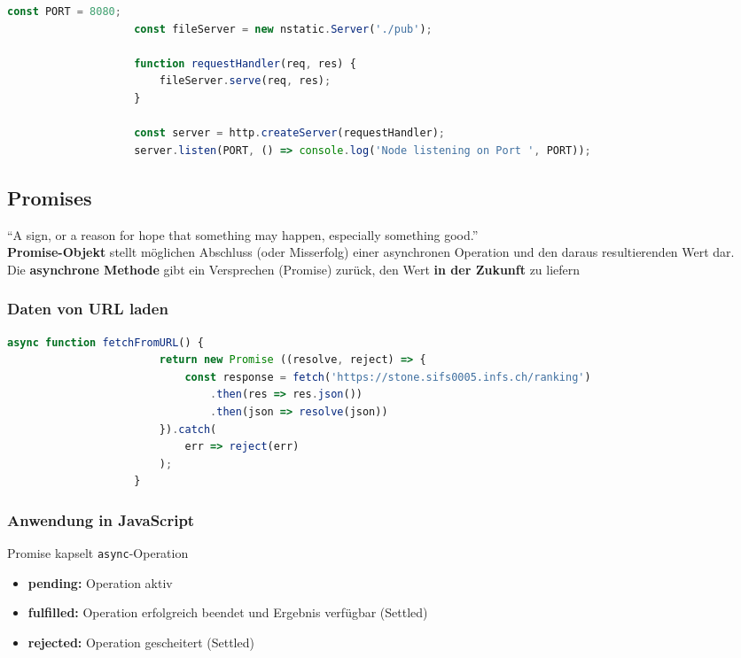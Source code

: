 \documentclass[a4paper, landscape, 8pt]{scrartcl}
\begin{document}
\begin{multicols*}{4}
\begin{lstlisting}[language=JavaScript]
                    const PORT = 8080;
                    const fileServer = new nstatic.Server('./pub');

                    function requestHandler(req, res) {
                        fileServer.serve(req, res);
                    }

                    const server = http.createServer(requestHandler);
                    server.listen(PORT, () => console.log('Node listening on Port ', PORT));
        \end{lstlisting}


        \subsection{Promises}
        \enquote{A sign, or a \textcolor{subsectioncolor}{reason for hope that something may happen}, especially something good.} \\
        \textbf{Promise-Objekt} stellt möglichen Abschluss (oder Misserfolg) einer asynchronen Operation und den daraus resultierenden Wert dar. \\
        Die \textbf{asynchrone Methode} gibt ein Versprechen (Promise) zurück, den Wert \textbf{in der Zukunft} zu liefern

        \subsubsection{Daten von URL laden}
        \begin{lstlisting}[language=JavaScript]
                    async function fetchFromURL() {
                        return new Promise ((resolve, reject) => {
                            const response = fetch('https://stone.sifs0005.infs.ch/ranking')
                                .then(res => res.json())
                                .then(json => resolve(json))
                        }).catch(
                            err => reject(err)
                        );
                    }
        \end{lstlisting}

        \subsubsection{Anwendung in JavaScript}
        Promise kapselt \texttt{async}-Operation

        \begin{itemize}
            \item \textbf{\textcolor{subsectioncolor}{pending:}} Operation aktiv
            \item \textbf{\textcolor{subsectioncolor}{fulfilled:}} Operation erfolgreich beendet und Ergebnis verfügbar (Settled)
            \item \textbf{\textcolor{subsectioncolor}{rejected:}} Operation gescheitert (Settled)
        \end{itemize}


\end{multicols*}
\end{document}
